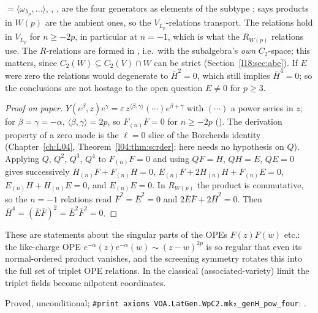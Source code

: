 \begin{dictionary}
 $=\langle\omega_{\lambda_p},\ldots\rangle$, , ,  are the four
generators as elements of the subtype ;  says products in
$W(p)$ are the ambient ones, so the $V_{L_p}$-relations transport. The relations hold in $V_{L_p}$
for $n\ge-2p$, in particular at $n=-1$, which is what the $R_{W(p)}$ relations use. The $R$-relations
are formed in , i.e.\ with the subalgebra's \emph{own} $C_2$-space; this
matters, since $C_2(W)\subseteq C_2(V)\cap W$ can be strict (Section~\ref{l18:sec:abe}). If $E$ were
zero the relations would degenerate to $\bar H^2=0$, which still implies $\bar H^4=0$; so the
conclusions are not hostage to the open question $E\ne0$ for $p\ge3$.
\end{dictionary}
\begin{proof}[Proof on paper]
$Y(e^\beta,z)e^\gamma=\varepsilon\,z^{\langle\beta,\gamma\rangle}(\cdots)e^{\beta+\gamma}$ with $(\cdots)$ a power series in $z$;
for $\beta=\gamma=-\alpha$, $\langle\beta,\gamma\rangle=2p$, so $F_{(n)}F=0$ for $n\ge-2p$
(). The derivation property of a zero mode is the $\ell=0$ slice of
the Borcherds identity (Chapter~\ref{ch:L04}, Theorem~\ref{l04:thm:scrder}; here
 needs no hypothesis on $Q$). Applying $Q$, $Q^2$, $Q^3$,
$Q^4$ to $F_{(n)}F=0$ and using $QF=H$, $QH=E$, $QE=0$ gives successively $H_{(n)}F+F_{(n)}H=0$,
$E_{(n)}F+2H_{(n)}H+F_{(n)}E=0$, $E_{(n)}H+H_{(n)}E=0$, and $E_{(n)}E=0$. In $R_{W(p)}$ the product is
commutative, so the $n=-1$ relations read $\bar F^2=\bar E^2=0$ and $2\bar E\bar F+2\bar H^2=0$. Then
$\bar H^4=(\bar E\bar F)^2=\bar E^2\bar F^2=0$.
\end{proof}
\begin{physics}
These are statements about the singular parts of the OPEs $F(z)F(w)$ etc.: the like-charge OPE
$e^{-\alpha}(z)e^{-\alpha}(w)\sim(z-w)^{2p}$ is so regular that even its normal-ordered product
vanishes, and the screening symmetry rotates this into the full set of triplet OPE relations. In the
classical (associated-variety) limit the triplet fields become nilpotent coordinates.
\end{physics}
\begin{status}
Proved, unconditional; \texttt{\#print axioms VOA.LatGen.WpC2.mk₂\_genH\_pow\_four}:
.
\end{status}

